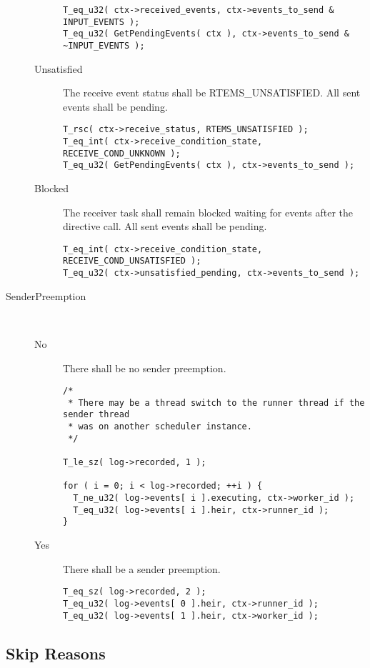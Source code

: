 \begin{description}
\begin{description}
\begin{verbatim}
T_eq_u32( ctx->received_events, ctx->events_to_send & INPUT_EVENTS );
T_eq_u32( GetPendingEvents( ctx ), ctx->events_to_send & ~INPUT_EVENTS );
\end{verbatim}
  \item[Unsatisfied]
    The receive event status shall be RTEMS\_UNSATISFIED.  All sent events
shall be pending.
\begin{verbatim}
T_rsc( ctx->receive_status, RTEMS_UNSATISFIED );
T_eq_int( ctx->receive_condition_state, RECEIVE_COND_UNKNOWN );
T_eq_u32( GetPendingEvents( ctx ), ctx->events_to_send );
\end{verbatim}
  \item[Blocked]
    The receiver task shall remain blocked waiting for events after the
directive call.  All sent events shall be pending.
\begin{verbatim}
T_eq_int( ctx->receive_condition_state, RECEIVE_COND_UNSATISFIED );
T_eq_u32( ctx->unsatisfied_pending, ctx->events_to_send );
\end{verbatim}
  \end{description}

  \item[SenderPreemption]~
  \begin{description}
  \item[No]
    There shall be no sender preemption.
\begin{verbatim}
/*
 * There may be a thread switch to the runner thread if the sender thread
 * was on another scheduler instance.
 */

T_le_sz( log->recorded, 1 );

for ( i = 0; i < log->recorded; ++i ) {
  T_ne_u32( log->events[ i ].executing, ctx->worker_id );
  T_eq_u32( log->events[ i ].heir, ctx->runner_id );
}
\end{verbatim}
  \item[Yes]
    There shall be a sender preemption.
\begin{verbatim}
T_eq_sz( log->recorded, 2 );
T_eq_u32( log->events[ 0 ].heir, ctx->runner_id );
T_eq_u32( log->events[ 1 ].heir, ctx->worker_id );
\end{verbatim}
  \end{description}

\end{description}


\subsection{Skip Reasons}

